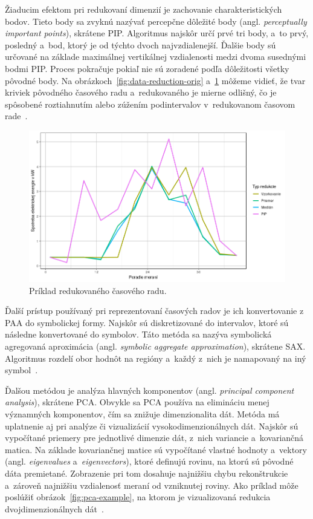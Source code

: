 \documentclass[a4paper,twoside,slovak,12pt,appendix]{article}
\begin{document}
Žiaducim efektom pri redukovaní dimenzií je zachovanie charakteristických bodov.
Tieto body sa zvyknú nazývať percepčne dôležité body (angl. \textit{perceptually
important points}), skrátene PIP. Algoritmus najskôr určí prvé tri body, a~to
prvý, posledný a~bod, ktorý je od týchto dvoch najvzdialenejší. Ďalšie body sú
určované na základe maximálnej vertikálnej vzdialenosti medzi dvoma susednými
bodmi PIP. Proces pokračuje pokiaľ nie sú zoradené podľa dôležitosti všetky
pôvodné body. Na obrázkoch~\ref{fig:data-reduction-orig}
a~\ref{fig:data-reduction-agg} môžeme vidieť, že tvar kriviek pôvodného časového
radu a~redukovaného je mierne odlišný, čo je spôsobené roztiahnutím alebo
zúžením podintervalov v~redukovanom časovom rade~\cite{Fu2011}.

\begin{figure}[htbp]
  \centering
  \includegraphics[width=\textwidth]{data_reduction_agg.png}
  \caption{Príklad redukovaného časového radu.}
  \label{fig:data-reduction-agg}
\end{figure}

Ďalší prístup používaný pri reprezentovaní časových radov je ich konvertovanie
z PAA do symbolickej formy. Najskôr sú diskretizované do intervalov, ktoré sú
následne konvertované do symbolov. Táto metóda sa nazýva symbolická agregovaná
aproximácia (angl. \textit{symbolic aggregate approximation}), skrátene SAX.
Algoritmus rozdelí obor hodnôt na regióny a~každý z~nich je namapovaný na iný
symbol~\cite{Fu2011}.

Ďalšou metódou je analýza hlavných komponentov (angl. \textit{principal
component analysis}), skrátene PCA. Obvykle sa PCA používa na elimináciu menej
významných komponentov, čím sa znižuje dimenzionalita dát. Metóda má uplatnenie
aj pri analýze či vizualizácií vysokodimenzionálnych dát. Najskôr sú vypočítané
priemery pre jednotlivé dimenzie dát, z~nich variancie a~kovariančná matica. Na
základe kovariančnej matice sú vypočítané vlastné hodnoty a~vektory (angl.
\textit{eigenvalues} a~\textit{eigenvectors}), ktoré definujú rovinu, na ktorú
sú pôvodné dáta premietané. Zobrazenie pri tom dosahuje najnižšiu chybu
rekonštrukcie a~zároveň najnižšiu vzdialenosť meraní od vzniknutej roviny. Ako
príklad môže poslúžiť obrázok~\ref{fig:pca-example}, na ktorom je vizualizovaná
redukcia dvojdimenzionálnych dát~\cite{Fu2011,Smith2002}.
\end{document}
